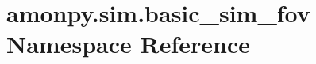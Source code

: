 \hypertarget{namespaceamonpy_1_1sim_1_1basic__sim__fov}{\section{amonpy.\-sim.\-basic\-\_\-sim\-\_\-fov Namespace Reference}
\label{namespaceamonpy_1_1sim_1_1basic__sim__fov}
}
